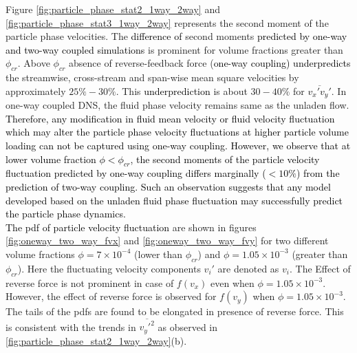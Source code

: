 \documentclass[notitlepage]{revtex4-1}
\begin{document}
Figure \ref{fig:particle_phase_stat2_1way_2way} and \ref{fig:particle_phase_stat3_1way_2way} represents the second moment of the particle phase velocities. The \textcolor{black}{difference of} second moments \textcolor{black}{predicted by one-way and two-way coupled simulations} is prominent for volume fractions greater than $\phi_{cr}$. Above $\phi_{cr}$ absence of reverse-feedback force (\textcolor{black}{one-way coupling) underpredicts} the streamwise, cross-stream and span-wise mean square velocities by approximately $25\%-30\%$. This \textcolor{black}{underprediction} is about $30-40\%$ for \textcolor{black}{$\overline{v_x'v_y'}$}. In one-way coupled DNS, the fluid phase velocity remains same as the unladen flow. 
\textcolor{black}{Therefore, any modification in fluid mean velocity or fluid velocity fluctuation which may alter the particle phase velocity fluctuations at higher particle volume loading can not be captured using one-way coupling. However, we observe that at lower volume fraction $\phi<\phi_{cr}$, the second moments of the particle velocity fluctuation predicted by one-way coupling differs marginally ($<10\%$) from the prediction of two-way coupling. Such an observation suggests that any model developed based on the unladen fluid phase fluctuation may successfully predict the particle phase dynamics.\\
The pdf of particle velocity fluctuation} are shown in figures \ref{fig:oneway_two_way_fvx} and \ref{fig:oneway_two_way_fvy} for two different volume fractions $\phi=7\times10^{-4}$ (lower than $\phi_{cr}$) and $\phi=1.05\times10^{-3}$ (greater than $\phi_{cr}$). Here the fluctuating velocity components $v_i'$ are denoted as $v_i$. The Effect of reverse force is not prominent in case of $f(v_x)$ even when $\phi=1.05\times10^{-3}$. However, the effect of reverse force is observed for $f(v_y)$ when $\phi=1.05\times10^{-3}$. The tails of the pdfs are found to be elongated in presence of reverse force. This is consistent with the trends in $\overline{v_y'^2}$ as observed in \ref{fig:particle_phase_stat2_1way_2way}(b).                
\end{document}
